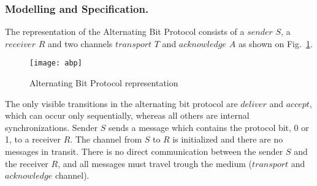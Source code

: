 
\subsubsection{Modelling and Specification.}
The representation of the Alternating Bit Protocol consists of a $sender$ $S$, a $receiver$ $R$ and two channels $transport$ $T$ and $acknowledge$ $A$ as shown on Fig.~\ref{fig:abp}. 

\begin{figure}[h]
\centering
\texttt{[image: abp]}
\caption{Alternating Bit Protocol representation}
\label{fig:abp}
\end{figure}

The only visible transitions in the alternating bit protocol are $deliver$ and $accept$, which can occur only sequentially, whereas all others are internal synchronizations. Sender $S$ sends a message which contains the protocol bit, 0 or 1, to a receiver $R$. The channel from $S$ to $R$ is initialized and there are no messages in transit. There is no direct communication between the sender $S$ and the receiver $R$, and all messages must travel trough the medium ($transport$ and $acknowledge$ channel). 

